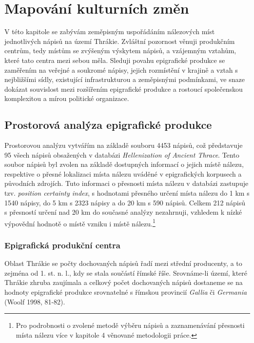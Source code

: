 \chapter{Mapování kulturních změn}
V této kapitole se zabývám zeměpisným uspořádáním nálezových míst jednotlivých nápisů na území Thrákie. Zvláštní pozornost věnuji produkčním centrům, tedy místům se zvýšeným výskytem nápisů, a vzájemným vztahům, které tato centra mezi sebou měla. Sleduji povahu epigrafické produkce se zaměřením na veřejné a soukromé nápisy, jejich rozmístění v krajině a vztah s nejbližšími sídly, existující infrastrukturou a zeměpisnými podmínkami, ve snaze dokázat souvislost mezi rozšířením epigrafické produkce a rostoucí společenskou komplexitou a mírou politické organizace.

\section[prostorová-analýza-epigrafické-produkce]{Prostorová analýza epigrafické produkce}

Prostorovou analýzu vytvářím na základě souboru 4453 nápisů, což představuje 95  všech nápisů obsažených v databázi {\em Hellenization of Ancient Thrace}. Tento soubor nápisů byl zvolen na základě dostupných informací o jejich místě nálezu, respektive o přesné lokalizaci místa nálezu uváděné v epigrafických korpusech a původních zdrojích. Tuto informaci o přesnosti místa nálezu v databázi zastupuje tzv. {\em position certainty index}, s hodnotami přesného určení místa nálezu do 1 km s 1540 nápisy, do 5 km s 2323 nápisy a do 20 km s 590 nápisů. Celkem 212 nápisů s přesností určení nad 20 km do současné analýzy nezahrnuji, vzhledem k nízké výpovědní hodnotě o místě vzniku i místě nálezu.\footnote{Pro podrobnosti o zvolené metodě výběru nápisů a zaznamenávání přesnosti místa nálezu více v kapitole 4 věnované metodologii práce.}

\subsection[epigrafická-produkční-centra-1]{Epigrafická produkční centra}

Oblast Thrákie se počty dochovaných nápisů řadí mezi střední producenty, a to zejména od 1. st. n. l., kdy se stala součástí římské říše. Srovnáme-li území, které Thrákie zhruba zaujímala a celkový počet dochovaných nápisů dostaneme se na hodnoty epigrafické produkce srovnatelné s římskou provincií {\em Gallia} či {\em Germania} (Woolf 1998, 81-82).

